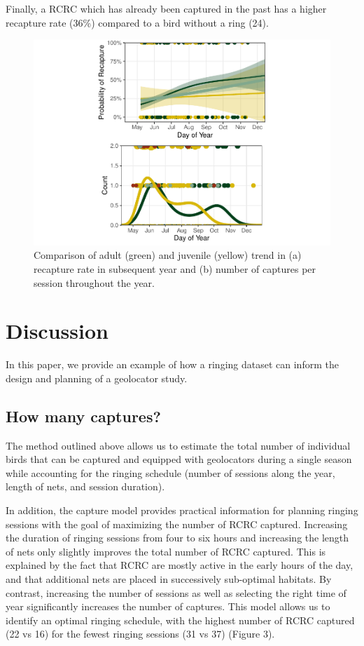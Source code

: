 \documentclass[]{interact}
\theoremstyle{plain}%
\theoremstyle{definition}
\theoremstyle{remark}
\begin{document}
Finally, a RCRC which has already been captured in the past has a higher
recapture rate (36\%) compared to a bird without a ring (24).

\begin{figure}
\centering
\includegraphics{manuscript_files/figure-latex/recapture rate-1.pdf}
\caption{Comparison of adult (green) and juvenile (yellow) trend in (a)
recapture rate in subsequent year and (b) number of captures per session
throughout the year.}
\end{figure}

\hypertarget{discussion}{%
\section{Discussion}\label{discussion}}

In this paper, we provide an example of how a ringing dataset can inform
the design and planning of a geolocator study.

\hypertarget{how-many-captures}{%
\subsection{How many captures?}\label{how-many-captures}}

The method outlined above allows us to estimate the total number of
individual birds that can be captured and equipped with geolocators
during a single season while accounting for the ringing schedule (number
of sessions along the year, length of nets, and session duration).

In addition, the capture model provides practical information for
planning ringing sessions with the goal of maximizing the number of RCRC
captured. Increasing the duration of ringing sessions from four to six
hours and increasing the length of nets only slightly improves the total
number of RCRC captured. This is explained by the fact that RCRC are
mostly active in the early hours of the day, and that additional nets
are placed in successively sub-optimal habitats. By contrast, increasing
the number of sessions as well as selecting the right time of year
significantly increases the number of captures. This model allows us to
identify an optimal ringing schedule, with the highest number of RCRC
captured (22 vs 16) for the fewest ringing sessions (31 vs 37) (Figure
3).
\end{document}

